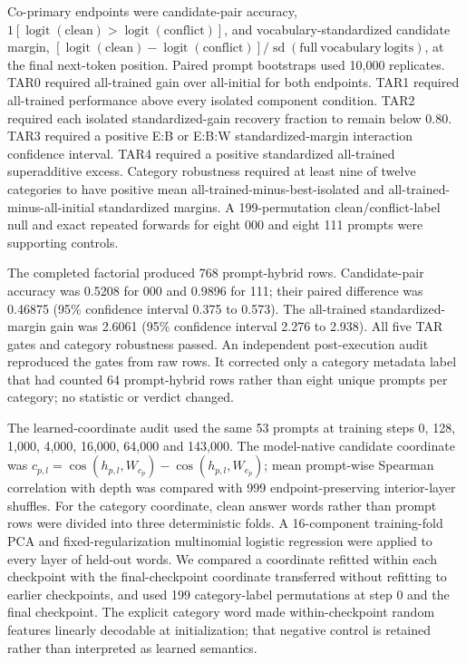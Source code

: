 \documentclass[12pt]{article}
\newcommand{\codeid}[1]{{\ttfamily\footnotesize #1}}
\begin{document}
Co-primary endpoints were candidate-pair accuracy, \(1[\operatorname{logit}(\mathrm{clean})>\operatorname{logit}(\mathrm{conflict})]\), and vocabulary-standardized candidate margin, \([\operatorname{logit}(\mathrm{clean})-\operatorname{logit}(\mathrm{conflict})]/\operatorname{sd}(\mathrm{full\ vocabulary\ logits})\), at the final next-token position. Paired prompt bootstraps used 10,000 replicates. TAR0 required all-trained gain over all-initial for both endpoints. TAR1 required all-trained performance above every isolated component condition. TAR2 required each isolated standardized-gain recovery fraction to remain below 0.80. TAR3 required a positive E:B or E:B:W standardized-margin interaction confidence interval. TAR4 required a positive standardized all-trained superadditive excess. Category robustness required at least nine of twelve categories to have positive mean all-trained-minus-best-isolated and all-trained-minus-all-initial standardized margins. A 199-permutation clean/conflict-label null and exact repeated forwards for eight \codeid{000} and eight \codeid{111} prompts were supporting controls.

The completed factorial produced 768 prompt-hybrid rows. Candidate-pair accuracy was 0.5208 for \codeid{000} and 0.9896 for \codeid{111}; their paired difference was 0.46875 (95\% confidence interval 0.375 to 0.573). The all-trained standardized-margin gain was 2.6061 (95\% confidence interval 2.276 to 2.938). All five TAR gates and category robustness passed. An independent post-execution audit reproduced the gates from raw rows. It corrected only a category metadata label that had counted 64 prompt-hybrid rows rather than eight unique prompts per category; no statistic or verdict changed.

The learned-coordinate audit used the same 53 prompts at training steps 0, 128, 1,000, 4,000, 16,000, 64,000 and 143,000. The model-native candidate coordinate was \(c_{p,l}=\cos(h_{p,l},W_{c_p})-\cos(h_{p,l},W_{e_p})\); mean prompt-wise Spearman correlation with depth was compared with 999 endpoint-preserving interior-layer shuffles. For the category coordinate, clean answer words rather than prompt rows were divided into three deterministic folds. A 16-component training-fold PCA and fixed-regularization multinomial logistic regression were applied to every layer of held-out words. We compared a coordinate refitted within each checkpoint with the final-checkpoint coordinate transferred without refitting to earlier checkpoints, and used 199 category-label permutations at step 0 and the final checkpoint. The explicit category word made within-checkpoint random features linearly decodable at initialization; that negative control is retained rather than interpreted as learned semantics.
\end{document}
